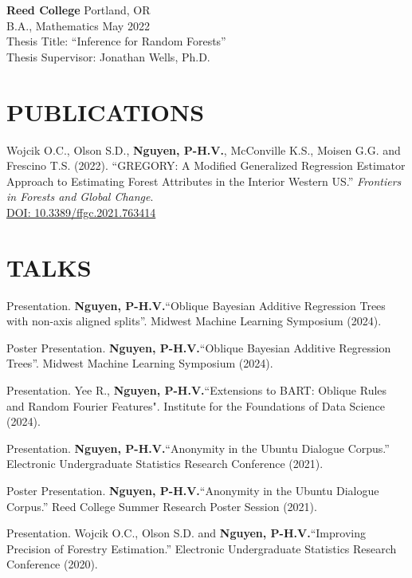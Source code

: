\documentclass[margin]{res}
\def\pvn{\textbf{Nguyen, P-H.V.}}
\begin{document}
\begin{resume}
                {\bf Reed College} \hfill Portland, OR \\
                B.A., Mathematics \hfill May 2022 \\
                Thesis Title: ``Inference for Random Forests'' \\
                Thesis Supervisor: Jonathan Wells, Ph.D.
  
  


\section{PUBLICATIONS}

Wojcik O.C., Olson S.D., \pvn, McConville K.S., Moisen G.G. and Frescino T.S. (2022). ``GREGORY: A Modified Generalized Regression Estimator Approach to Estimating Forest Attributes in the Interior Western US.'' \textit{Frontiers in Forests and Global Change}. \\ \href{https://doi.org/10.3389/ffgc.2021.763414}{DOI: 10.3389/ffgc.2021.763414}



\section{TALKS}

Presentation. \pvn ``Oblique Bayesian Additive Regression Trees with non-axis aligned splits''. Midwest Machine Learning Symposium (2024).

Poster Presentation. \pvn ``Oblique Bayesian Additive Regression Trees''. Midwest Machine Learning Symposium (2024).

Presentation. Yee R., \pvn  ``Extensions to BART: Oblique Rules and Random Fourier Features". Institute for the Foundations of Data Science (2024).

Presentation. \pvn ``Anonymity in the Ubuntu Dialogue Corpus.” Electronic Undergraduate Statistics Research Conference (2021).

Poster Presentation. \pvn ``Anonymity in the Ubuntu Dialogue Corpus.” Reed College Summer Research Poster Session (2021).

Presentation. Wojcik O.C., Olson S.D. and \pvn ``Improving Precision of Forestry Estimation.” Electronic Undergraduate Statistics Research Conference (2020).


\end{resume}
\end{document}
